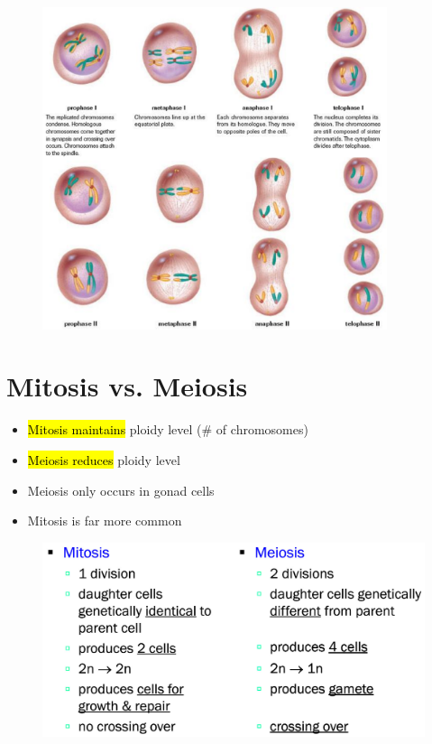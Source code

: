 \documentclass[a4paper,12pt]{article}
\begin{document}
\begin{figure}[H]
    \centering
    \includegraphics[width=0.9\textwidth]{meiosis}
\end{figure}

\section{Mitosis vs. Meiosis}
\begin{itemize}
    \item{\hl{Mitosis maintains} ploidy level (\# of chromosomes)}
    \item{\hl{Meiosis reduces} ploidy level}
        \\
    \item{Meiosis only occurs in gonad cells}
    \item{Mitosis is far more common}
\end{itemize}

\begin{figure}[H]
    \centering
    \includegraphics[width=\textwidth]{compare}
\end{figure}
\end{document}
